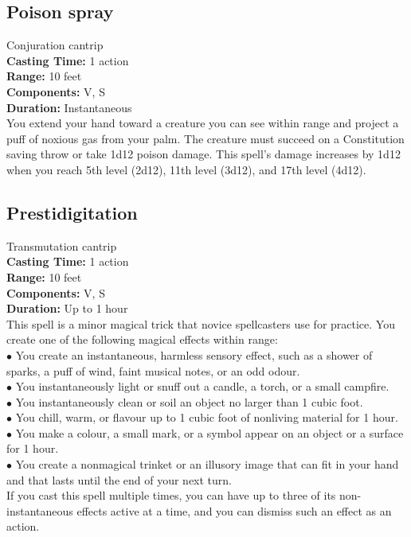 \documentclass[11pt, A4paper, english]{article}
\begin{document}
		\subsection{Poison spray}
Conjuration cantrip \\
\textbf{Casting Time:} 1 action \\
\textbf{Range:} 10 feet \\
\textbf{Components:} V, S \\
\textbf{Duration:} Instantaneous \\
You extend your hand toward a creature you can see within range and project a puff of noxious gas from your palm. The creature must succeed on a Constitution saving throw or take 1d12 poison damage. This spell's damage increases by 1d12 when you reach 5th level (2d12), 11th level (3d12), and 17th level (4d12).

		\subsection{Prestidigitation}
Transmutation cantrip \\
\textbf{Casting Time:} 1 action \\
\textbf{Range:} 10 feet \\
\textbf{Components:} V, S \\
\textbf{Duration:} Up to 1 hour \\
This spell is a minor magical trick that novice spellcasters use for practice. You create one of the following magical effects within range: \\
\indent $\bullet$ You create an instantaneous, harmless sensory effect, such as a shower of sparks, a puff of wind, faint musical notes, or an odd odour. \\
\indent $\bullet$ You instantaneously light or snuff out a candle, a torch, or a small campfire. \\
\indent $\bullet$ You instantaneously clean or soil an object no larger than 1 cubic foot. \\
\indent $\bullet$ You chill, warm, or flavour up to 1 cubic foot of nonliving material for 1 hour. \\
\indent $\bullet$ You make a colour, a small mark, or a symbol appear on an object or a surface for 1 hour. \\
\indent $\bullet$ You create a nonmagical trinket or an illusory image that can fit in your hand and that lasts until the end of your next turn. \\
If you cast this spell multiple times, you can have up to three of its non-instantaneous effects active at a time, and you can dismiss such an effect as an action.
\end{document}
